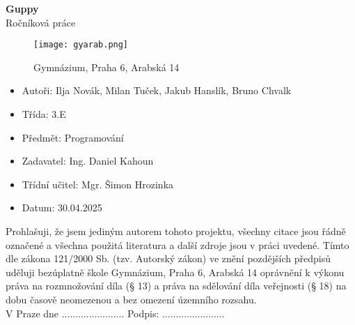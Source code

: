 \thispagestyle{empty}
\setlength{\parindent}{1cm}

\begin{center}
    \b{\Huge{\textbf{Guppy}}} \\
    \vspace{0.5cm}
    \huge{Ročníková práce} \\
\end{center}

\begin{figure}[h]
    \centering
    \texttt{[image: gyarab.png]}
    \captionsetup{labelformat=empty}
    \vspace{0.5cm}
    \caption[\url{https://github.com/gyarab?language=scala}]{\Large Gymnázium, Praha 6, Arabská 14}
\end{figure}

\vspace{6cm}

\begin{itemize}
    \large
    \item Autoři: Ilja Novák, Milan Tuček, Jakub Hanslík, Bruno Chvalk
    \item Třída: 3.E
    \item Předmět: Programování
    \item Zadavatel: Ing. Daniel Kahoun 
    \item Třídní učitel: Mgr. Šimon Hrozinka
    \item Datum: 30.04.2025
\end{itemize}

\restoregeometry

\newpage
\thispagestyle{empty}

\vspace*{\fill}

\large
Prohlašuji, že jsem jediným autorem tohoto projektu, všechny citace jsou řádně označené a všechna použitá literatura a další zdroje jsou v práci uvedené. Tímto dle zákona 121/2000 Sb. (tzv. Autorský zákon) ve znění pozdějších předpisů uděluji bezúplatně škole Gymnázium, Praha 6, Arabská 14 oprávnění k výkonu práva na rozmnožování díla (§ 13) a práva na sdělování díla veřejnosti (§ 18) na dobu časově neomezenou a bez omezení územního rozsahu. \\

\noindent V Praze dne ....................... \hspace{1cm} Podpis: .......................